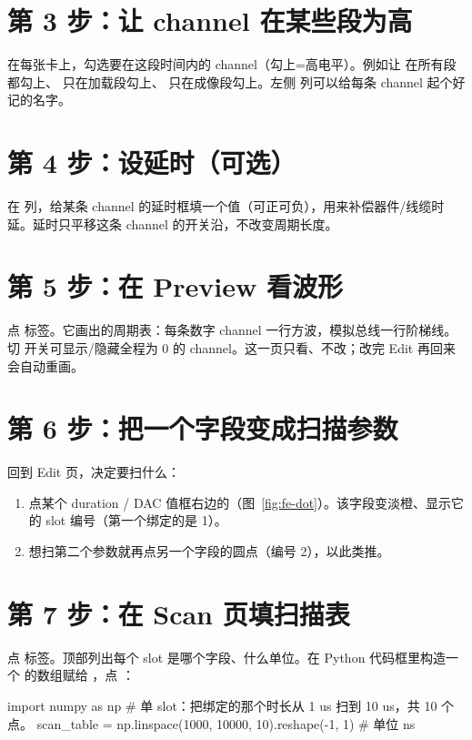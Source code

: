 \documentclass[11pt,oneside,openany]{book}
\begin{document}
\section{第 3 步：让 channel 在某些段为高}
在每张卡上，勾选要在这段时间内的 channel（勾上=高电平）。例如让  在所有段都勾上、 只在加载段勾上、 只在成像段勾上。左侧  列可以给每条 channel 起个好记的名字。

\section{第 4 步：设延时（可选）}
在  列，给某条 channel 的延时框填一个值（可正可负），用来补偿器件/线缆时延。延时只平移这条 channel 的开关沿，不改变周期长度。

\section{第 5 步：在 Preview 看波形}
点  标签。它画出的周期表：每条数字 channel 一行方波，模拟总线一行阶梯线。切  开关可显示/隐藏全程为 0 的 channel。这一页只看、不改；改完 Edit 再回来会自动重画。

\section{第 6 步：把一个字段变成扫描参数}
回到 Edit 页，决定要扫什么：
\begin{enumerate}
  \item 点某个 duration / DAC 值框右边的（图~\ref{fig:fe-dot}）。该字段变淡橙、显示它的 slot 编号（第一个绑定的是 1）。
  \item 想扫第二个参数就再点另一个字段的圆点（编号 2），以此类推。
\end{enumerate}

\section{第 7 步：在 Scan 页填扫描表}
点  标签。顶部列出每个 slot 是哪个字段、什么单位。在 Python 代码框里构造一个  的数组赋给 ，点 ：

\begin{codeblock}
import numpy as np
# 单 slot：把绑定的那个时长从 1 us 扫到 10 us，共 10 个点。
scan_table = np.linspace(1000, 10000, 10).reshape(-1, 1)   # 单位 ns
\end{codeblock}
\end{document}
